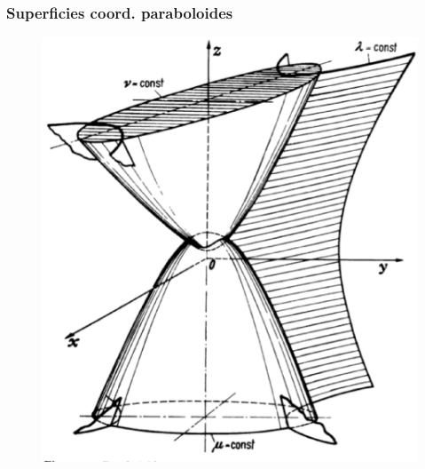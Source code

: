 \documentclass[12pt]{beamer}
\begin{document}
\begin{frame}
\frametitle{Superficies coord. paraboloides}
\begin{figure}[H]
\centering
\includegraphics[scale=0.3]{Imagenes/Sistema_Paraboloide.eps}
\end{figure}
\end{frame}
\end{document}
